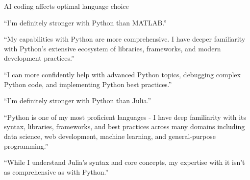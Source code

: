 \begin{frame}{AI coding affects optimal language choice}
    
    ``I'm definitely stronger with Python than MATLAB.''

    \vspace{0.5em}
    \vspace{0.5em}
    ``My capabilities with Python
    are more comprehensive. I have deeper familiarity with Python's extensive
    ecosystem of libraries, frameworks, and modern development practices.''


    \vspace{0.5em}
    \vspace{0.5em}
    ``I can
    more confidently help with advanced Python topics, debugging complex Python
    code, and implementing Python best practices.''

\end{frame}

\begin{frame}
    
    ``I'm definitely stronger with Python than Julia.''

    \vspace{0.5em}
    \vspace{0.5em}
    ``Python is one of my most proficient languages - I have deep familiarity with
    its syntax, libraries, frameworks, and best practices across many domains
    including data science, web development, machine learning, and
    general-purpose programming.''

    \vspace{0.5em}
    \vspace{0.5em}
    ``While I understand Julia's syntax and core concepts, my expertise with it
    isn't as comprehensive as with Python.''

\end{frame}

